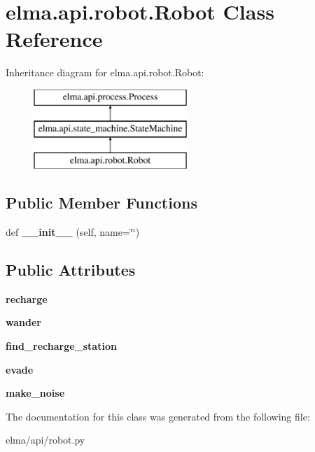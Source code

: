 \hypertarget{classelma_1_1api_1_1robot_1_1Robot}{}\section{elma.\+api.\+robot.\+Robot Class Reference}
\label{classelma_1_1api_1_1robot_1_1Robot}
Inheritance diagram for elma.\+api.\+robot.\+Robot\+:\begin{figure}[H]
\begin{center}
\leavevmode
\includegraphics[height=3.000000cm]{classelma_1_1api_1_1robot_1_1Robot}
\end{center}
\end{figure}
\subsection*{Public Member Functions}
\begin{DoxyCompactItemize}
\item 
\mbox{\label{classelma_1_1api_1_1robot_1_1Robot_aa569723562580d98b16ef858b85c5154}} 
def {\bfseries \+\_\+\+\_\+init\+\_\+\+\_\+} (self, name=\char`\"{}\char`\"{})
\end{DoxyCompactItemize}
\subsection*{Public Attributes}
\begin{DoxyCompactItemize}
\item 
\mbox{\label{classelma_1_1api_1_1robot_1_1Robot_ab1fa357b053ae9c5a0619689698e9bbc}} 
{\bfseries recharge}
\item 
\mbox{\label{classelma_1_1api_1_1robot_1_1Robot_ad527326117d39ba9cad2d3673df59ca6}} 
{\bfseries wander}
\item 
\mbox{\label{classelma_1_1api_1_1robot_1_1Robot_a6b9bc3b5714ccfadf434c266e6f42639}} 
{\bfseries find\+\_\+recharge\+\_\+station}
\item 
\mbox{\label{classelma_1_1api_1_1robot_1_1Robot_a31f1c867344f45e87b6dfe9d958d13dd}} 
{\bfseries evade}
\item 
\mbox{\label{classelma_1_1api_1_1robot_1_1Robot_a7314c2483ca6d96cf75016cb4e7cf43e}} 
{\bfseries make\+\_\+noise}
\end{DoxyCompactItemize}


The documentation for this class was generated from the following file\+:\begin{DoxyCompactItemize}
\item 
elma/api/robot.\+py\end{DoxyCompactItemize}
